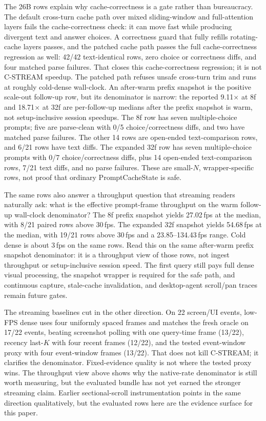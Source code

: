 The 26B rows explain why cache-correctness is a gate rather than bureaucracy.
The default cross-turn cache path over mixed sliding-window and full-attention
layers fails the cache-correctness check: it can move fast while producing
divergent text and answer choices. A correctness guard that fully
refills rotating-cache layers passes, and the patched cache path passes the
full cache-correctness regression as well: 42/42 text-identical rows, zero choice or
correctness diffs, and four matched parse failures. That closes this
cache-correctness regression; it is not C-STREAM speedup. The patched path
refuses unsafe cross-turn trim and runs at roughly cold-dense wall-clock. An
after-warm prefix snapshot is
the positive scale-out follow-up row, but its denominator is narrow: the
reported 9.11$\times$ at 8f and
18.71$\times$ at 32f are per-follow-up medians after the prefix snapshot is
warm, not setup-inclusive session speedups. The 8f row has seven
multiple-choice prompts; five are parse-clean with 0/5 choice/correctness
diffs, and two have matched parse failures. The other 14 rows are open-ended
text-comparison rows, and 6/21 rows have text diffs. The expanded 32f row has seven
multiple-choice prompts with 0/7 choice/correctness diffs, plus 14 open-ended
text-comparison rows, 7/21 text diffs, and no parse failures. These are small-\(N\),
wrapper-specific rows, not proof that ordinary PromptCacheState is safe.

The same rows also answer a throughput question that streaming readers
naturally ask: what is the effective prompt-frame throughput on the warm
follow-up wall-clock denominator? The 8f prefix snapshot yields
27.02\,fps at the median, with 8/21 paired rows above 30\,fps. The expanded 32f
snapshot yields 54.68\,fps at the median, with 19/21 rows above 30\,fps and a
23.85--134.43\,fps range. Cold dense is about 3\,fps on the same rows.
Read this on the same after-warm prefix snapshot denominator: it is a throughput
view of those rows, not ingest throughput or setup-inclusive session speed. The
first query still pays full dense visual processing, the snapshot wrapper is
required for the safe path, and continuous capture, stale-cache invalidation,
and desktop-agent scroll/pan traces remain future gates.

The streaming baselines cut in the other direction. On 22 screen/UI events,
low-FPS dense uses four uniformly spaced frames and matches the fresh oracle on
17/22 events, beating screenshot polling with one query-time frame (13/22),
recency last-\(K\) with four recent frames (12/22), and the tested
event-window proxy with four event-window frames (13/22). That does not kill
C-STREAM; it clarifies the denominator. Fixed-evidence quality is not where the
tested proxy wins. The throughput view above shows why the native-rate denominator is
still worth measuring, but the evaluated bundle has not yet earned the stronger
streaming claim. Earlier sectional-scroll instrumentation points in the same
direction qualitatively, but the evaluated rows here are the evidence
surface for this paper.

